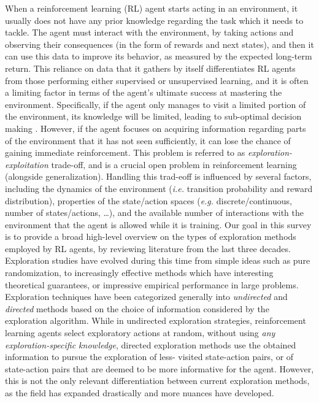 

When a reinforcement learning (RL) agent starts acting in an environment, it usually does not have any prior knowledge regarding the task which it needs to tackle. The agent must interact with the environment, by taking actions and observing their consequences (in the form of rewards and next states), and then it can use this data to improve its behavior, as measured by the expected long-term return. This reliance on data that it gathers by itself differentiates RL agents from those performing either supervised or unsupervised learning, and it is often a limiting factor in terms of the agent's ultimate success at mastering the environment.
Specifically, if the agent only manages to visit a limited portion of the environment, its knowledge will be limited, leading to sub-optimal decision making . However, if the agent focuses on acquiring information regarding  parts of the environment that it has not seen sufficiently,  it can lose the chance of gaining immediate reinforcement. This problem is referred to as \emph{exploration-exploitation} trade-off, and is a crucial open problem in  reinforcement learning (alongside generalization). Handling this trad-eoff is influenced by several factors, including the dynamics of the environment (\emph{i.e.} transition probability and reward distribution), properties of the state/action spaces (\emph{e.g.} discrete/continuous, number of states/actions, \dots), and the available number of interactions with the environment that the agent is allowed while it is training.
Our goal in this survey is to provide a broad high-level overview on the types of exploration methods employed by RL agents, by reviewing literature from the last three decades.   
Exploration studies have evolved during this time from simple ideas such as pure randomization, to increasingly effective methods which have interesting theoretical guarantees, or impressive empirical performance in large problems. 
Exploration techniques have been categorized generally into \emph{undirected} and \emph{directed} methods  based on the choice of  information considered by the exploration algorithm. While in undirected exploration strategies, reinforcement learning agents select exploratory actions at random, without using \emph{any  exploration-specific knowledge}, directed exploration methods use the obtained information to pursue the exploration of less- visited state-action pairs, or of state-action pairs that are deemed to be more informative for the agent. 
However, this is not the only relevant differentiation between current exploration methods, as the field has expanded drastically and more nuances have developed.
